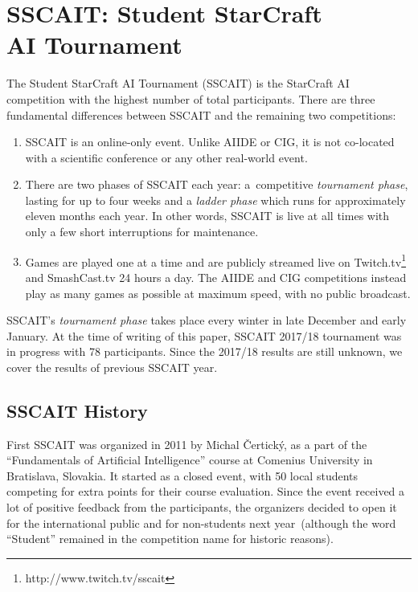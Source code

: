 \vskip 10mm
\section{SSCAIT: Student StarCraft\\ AI Tournament}\label{subsecSSCAIT}

The Student StarCraft AI Tournament (SSCAIT) is the StarCraft AI competition with the highest number of total participants. There are three fundamental differences between SSCAIT and the remaining two competitions:
\begin{enumerate}
  \item SSCAIT is an online-only event. Unlike AIIDE or CIG, it is not co-located with a scientific conference or any other real-world event. \item There are two phases of SSCAIT each year: a~competitive {\em tournament phase}, lasting for up to four weeks and a {\em ladder phase} which runs for approximately eleven months each year. In other words, SSCAIT is live at all times with only a 
few short interruptions for maintenance.
  \item Games are played one at a time and are publicly streamed live on Twitch.tv\footnote{http://www.twitch.tv/sscait} and SmashCast.tv 24 hours a day. The AIIDE and CIG competitions instead play as many games as possible at maximum speed, with no public broadcast.
\end{enumerate}

\vskip 3mm

SSCAIT's {\em tournament phase} takes place every winter in late December and early January. At the time of writing of this paper, SSCAIT 2017/18 tournament was in progress with 78 participants. Since the 2017/18 results are still unknown, we cover the results of previous SSCAIT year.


\subsection{SSCAIT History}

First SSCAIT was organized in 2011 by Michal \v{C}ertick\'{y}, as a part of the ``Fundamentals of Artificial Intelligence'' course at Comenius University in Bratislava, Slovakia. It started as a closed event, with 50 local students competing for extra points for their course evaluation. Since the event received a lot of positive feedback from the participants, the organizers decided to open it for the international public and for non-students next year~(although the word ``Student'' remained in the competition name for historic reasons). 

